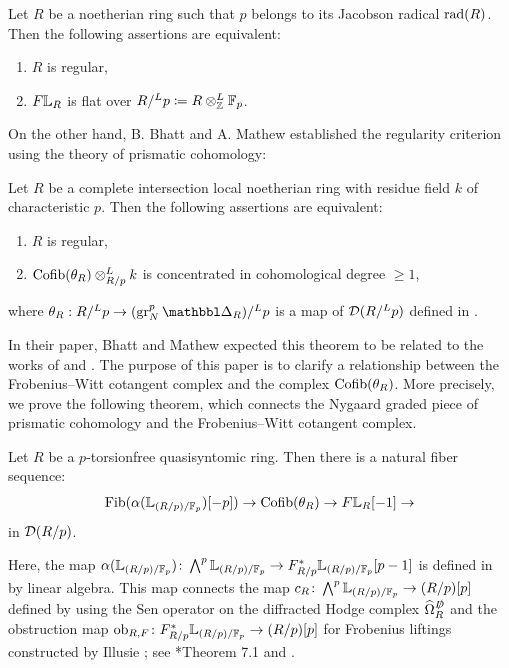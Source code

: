 \documentclass[11pt,a4paper]{amsart}
\begin{document}
\begin{theorem}\label{theorem1.1}
        Let $R$ be a noetherian ring such that \(p\) belongs to its Jacobson radical $\operatorname{rad}(R)$. Then the following assertions are equivalent:
        \begin{enumerate}
            \item $R$ is regular,
            \item $F\mathbb{L}_R$ is flat over $R/^Lp \coloneqq R \otimes^L_{\mathbb{Z}} \mathbb{F}_p$.
        \end{enumerate}
\end{theorem}
On the other hand, B. Bhatt and A. Mathew established the regularity criterion using the theory of prismatic cohomology:
\begin{theorem}\label{theorem1.2}
    Let $R$ be a complete intersection local noetherian ring with residue field $k$ of characteristic $p$. Then the following assertions are equivalent:
    \begin{enumerate}
        \item $R$ is regular,
        \item $\operatorname{Cofib}(\theta_R)\otimes_{R/p}^Lk$ is concentrated in cohomological degree $\ge 1$,
    \end{enumerate}
    where $\theta_R:R/^L p\to (\gr_N^p\prism_R)/^Lp$ is a map of $\mathcal{D}(R/^L p)$ defined in \cite{bhatt2023Syntomic}.
\end{theorem}
In their paper, Bhatt and Mathew expected this theorem to be related to the works of \cite{saito2022Frobenius} and \cite{HochsterJefferies24}. The purpose of this paper is to clarify a relationship between the Frobenius--Witt cotangent complex and the complex $\operatorname{Cofib}(\theta_R)$. More precisely, we prove the following theorem, which connects the Nygaard graded piece of prismatic cohomology and the Frobenius--Witt cotangent complex.
\begin{maintheorem}
    Let $R$ be a $p$-torsionfree quasisyntomic ring. Then there is a natural fiber sequence:
    \[\operatorname{Fib}(\alpha(\mathbb{L}_{(R/p)/\mathbb{F}_p})[-p])\to \operatorname{Cofib}(\theta_R)\to F\mathbb{L}_R[-1]\to\] in $\mathcal{D}(R/p)$.
\end{maintheorem}
Here, the map $\alpha(\mathbb{L}_{(R/p)/\mathbb{F}_p}) \colon \bigwedge^p \mathbb{L}_{(R/p)/\mathbb{F}_p} \to F_{R/p}^*\mathbb{L}_{(R/p)/\mathbb{F}_p}[p-1]$ is defined in \cite{petrov2025Nondecomposability} by linear algebra.
This map connects the map \(c_R \colon \bigwedge^p \mathbb{L}_{(R/p)/\mathbb{F}_p} \to (R/p)[p]\) defined by using the Sen operator on the diffracted Hodge complex \(\widehat{\Omega}^{\slashed{D}}_R\) and the obstruction map \(\operatorname{ob}_{R, F} \colon F^*_{R/p}\mathbb{L}_{(R/p)/\mathbb{F}_p} \to (R/p)[p]\) for Frobenius liftings constructed by Illusie \cite{illusie1971Complexe}; see \cite{petrov2025Nondecomposability}*{Theorem 7.1} and .
\end{document}
